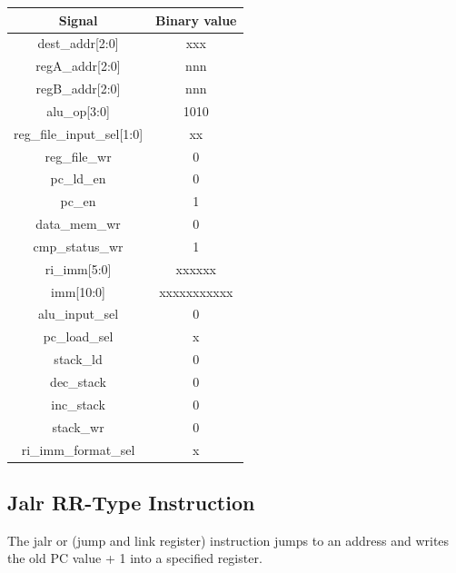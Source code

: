 \documentclass{article}
\begin{document}
\begin{par}
	\begin{center}
		\begin{tabular}{|c|c|}
			\hline 
			\textbf{Signal} & \textbf{Binary value} \\ 
			\hline 
			dest\_addr[2:0] & xxx \\ 
			\hline 
			regA\_addr[2:0] & nnn \\ 
			\hline 
			regB\_addr[2:0] & nnn \\ 
			\hline 
			alu\_op[3:0] & 1010 \\ 
			\hline 
			reg\_file\_input\_sel[1:0] & xx \\ 
			\hline 
			reg\_file\_wr & 0 \\ 
			\hline 
			pc\_ld\_en & 0 \\ 
			\hline 
			pc\_en & 1 \\ 
			\hline 
			data\_mem\_wr & 0 \\ 
			\hline 
			cmp\_status\_wr & 1 \\ 
			\hline 
			ri\_imm[5:0] & xxxxxx \\ 
			\hline 
			imm[10:0] & xxxxxxxxxxx \\ 
			\hline 
			alu\_input\_sel & 0 \\ 
			\hline 
			pc\_load\_sel & x \\ 
			\hline 
			stack\_ld & 0 \\ 
			\hline 
			dec\_stack & 0 \\ 
			\hline 
			inc\_stack & 0 \\ 
			\hline 
			stack\_wr & 0 \\ 
			\hline 
			ri\_imm\_format\_sel & x \\ 
			\hline 
		\end{tabular} 
	\end{center}

	\newpage
	\subsection{Jalr RR-Type Instruction}
	
	The jalr or (jump and link register) instruction jumps to an address and writes the old PC value + 1 into a specified register. 
	

\end{par}
\end{document}
